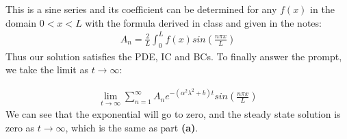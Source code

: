\documentclass{article}
\begin{document}
This is a sine series and its coefficient can be determined for any $f(x)$ in the domain $0<x<L$ with the formula derived in class and given in the notes:
\begin{equation}
\begin{aligned}
A_n = \frac{2}{L}\int_0^Lf(x)sin(\frac{n\pi x}{L})
\end{aligned}
\end{equation}
Thus our solution satisfies the PDE, IC and BCs. To finally answer the prompt, we take the limit as $t\to\infty$:
\begin{tcolorbox}[minipage,colback=white,arc=0pt,outer arc=0pt]
\begin{equation}
\begin{aligned}
\lim_{t\to\infty}\sum_{n=1}^\infty A_ne^{-(\alpha^2\lambda^2 + b)t}sin(\frac{n\pi x}{L})
\end{aligned}
\end{equation}
We can see that the exponential will go to zero, and the steady state solution is zero as $t\to\infty$, which is the same as part \textbf{(a)}.
\end{tcolorbox}
\end{document}

